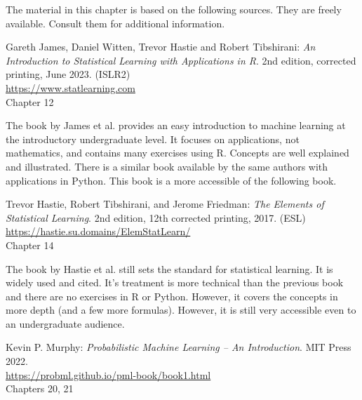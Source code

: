 The material in this chapter is based on the following sources. They are freely available. Consult them for additional information.

\begin{resourcebox}
Gareth James, Daniel Witten, Trevor Hastie and Robert Tibshirani: \emph{An Introduction to Statistical Learning with Applications in R}. 2nd edition, corrected printing, June 2023. (ISLR2) \\

\small\url{https://www.statlearning.com}\normalsize \\

Chapter 12
\end{resourcebox}

The book by James et al. provides an easy introduction to machine learning at the introductory undergraduate level. It focuses on applications, not mathematics, and contains many exercises using R. Concepts are well explained and illustrated. There is a similar book available by the same authors with applications in Python. This book is a more accessible of the following book.

\begin{resourcebox}
Trevor Hastie, Robert Tibshirani, and Jerome Friedman: \emph{The Elements of Statistical Learning}. 2nd edition, 12th corrected printing, 2017. (ESL) \\

\small\url{https://hastie.su.domains/ElemStatLearn/}\normalsize \\

Chapter 14
\end{resourcebox}

The book by Hastie et al. still sets the standard for statistical learning. It is widely used and cited. It's treatment is more technical than the previous book and there are no exercises in R or Python. However, it covers the concepts in more depth (and a few more formulas). However, it is still very accessible even to an undergraduate audience.

\begin{resourcebox}
Kevin P. Murphy: \emph{Probabilistic Machine Learning -- An Introduction}. MIT Press 2022. \\


\small\url{https://probml.github.io/pml-book/book1.html}\normalsize \\

Chapters 20, 21
\end{resourcebox}

